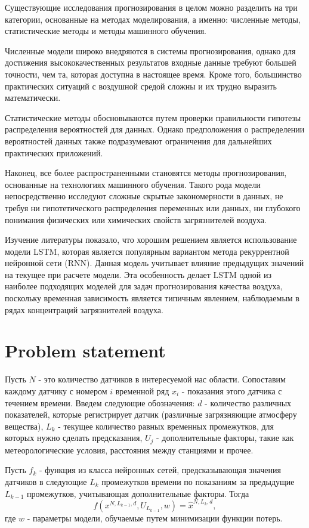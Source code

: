 \documentclass{article}
\begin{document}
Существующие исследования прогнозирования в целом можно разделить на три категории, основанные на методах моделирования, а именно: численные методы, статистические методы и методы машинного обучения. 

Численные модели широко внедряются в системы прогнозирования, однако для достижения высококачественных результатов входные данные требуют большей точности, чем та, которая доступна в настоящее время. Кроме того, большинство практических ситуаций с воздушной средой сложны и их трудно выразить математически. 

Статистические методы обосновываются путем проверки правильности гипотезы распределения вероятностей для данных. Однако предположения о распределении вероятностей данных также подразумевают ограничения для дальнейших практических приложений.

Наконец, все более распространенными становятся методы прогнозирования, основанные на технологиях машинного обучения. Такого рода модели непосредственно исследуют сложные скрытые закономерности в данных, не требуя ни гипотетического распределения переменных или данных, ни глубокого понимания физических или химических свойств загрязнителей воздуха.

Изучение литературы показало, что хорошим решением является использование модели LSTM, которая является популярным вариантом метода рекуррентной нейронной сети (RNN). Данная модель учитывает влияние предыдущих значений на текущее при расчете модели. Эта особенность делает LSTM одной из наиболее подходящих моделей для задач прогнозирования качества воздуха, поскольку временная зависимость является типичным явлением, наблюдаемым в рядах концентраций загрязнителей воздуха. 

\section{Problem statement}
Пусть $N$ - это количество датчиков в интересуемой нас области. Сопоставим каждому датчику с номером $i$ временной ряд $x_i$ - показания этого датчика с течением времени. Введем следующие обозначения: $d$ - количество различных показателей, которые регистрирует датчик (различные загрязняющие атмосферу вещества), $L_k$ - текущее количество равных временных промежутков, для которых нужно сделать предсказания, $U_j$ - дополнительные факторы, такие как метеорологические условия, расстояния между станциями и прочее. 

Пусть $f_k$ - функция из класса нейронных сетей, предсказывающая значения датчиков в следующие $L_k$ промежутков времени по показаниям за предыдущие $L_{k-1}$ промежутков, учитывающая дополнительные факторы. Тогда
$$ f(x^{N, L_{k-1}, d}, U_{L_{k-1}}, w) = \hat{x}^{N, L_k, d}, $$ где $w$ - параметры модели, обучаемые путем минимизации функции потерь. 




\end{document}
